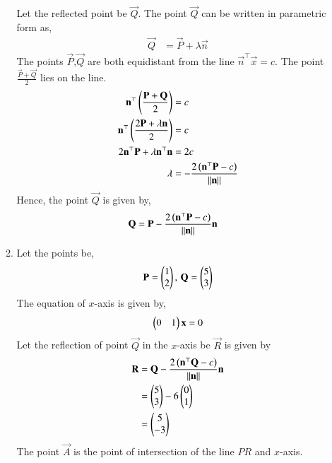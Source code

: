 \documentclass[journal,12pt,twocolumn]{IEEEtran}
\begin{document}
\begin{enumerate}
\begin{enumerate}
Let the reflected point be $\vec{Q}$. The point $\vec{Q}$ can be written in parametric form as,
\begin{align}
\vec{Q} &= \vec{P} + \lambda\vec{n}
\end{align}
The points $\vec{P}$,$\vec{Q}$ are both equidistant from the line $\vec{n}^{\top}\vec{x} = c$. The point $\frac{\vec{P}+\vec{Q}}{2}$ lies on the line.
\begin{align}
\mathbf{n}^{\top}\left(\frac{\mathbf{P}+\mathbf{Q}}{2}\right) &= c\\
\mathbf{n}^{\top}\left(\frac{2\mathbf{P}+\lambda\mathbf{n}}{2}\right) &= c\\
2\mathbf{n}^{\top}\mathbf{P}+\lambda\mathbf{n}^{\top}\mathbf{n} &= 2c\\
\lambda &= -\frac{2\left(\mathbf{n}^{\top}\mathbf{P}-c\right)}{\left\lVert\mathbf{n}\right\rVert}
\end{align}
Hence, the point $\vec{Q}$ is given by,
\begin{align}
\mathbf{Q} &= \mathbf{P} -\frac{2\left(\mathbf{n}^{\top}\mathbf{P}-c\right)}{\left\lVert\mathbf{n}\right\rVert}\mathbf{n}
\end{align}

\item Let the points be,
\begin{align}
\mathbf{P} = \begin{pmatrix}1\\2\end{pmatrix}, \, \mathbf{Q} = \begin{pmatrix}5\\3\end{pmatrix}
\end{align}
The equation of $x$-axis is given by,
\begin{align}
\begin{pmatrix}0&1\end{pmatrix}\mathbf{x} = 0
\end{align}
Let the reflection of point $\vec{Q}$ in the $x$-axis be $\vec{R}$ is given by
\begin{align}
\mathbf{R} &= \mathbf{Q} -\frac{2\left(\mathbf{n}^{\top}\mathbf{Q}-c\right)}{\left\lVert\mathbf{n}\right\rVert}\mathbf{n}\\
&= \begin{pmatrix}5\\3\end{pmatrix} - 6\begin{pmatrix}0\\1\end{pmatrix}\\
&= \begin{pmatrix}5\\-3\end{pmatrix}
\end{align}
The point $\vec{A}$ is the point of intersection of the line $PR$ and $x$-axis.


\end{enumerate}
\end{enumerate}
\end{document}
